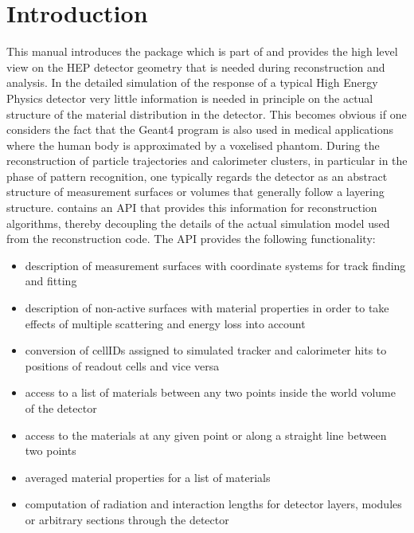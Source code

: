 \documentclass[10pt,a4paper]{article}
\begin{document}
\clearpage
%
%
\tableofcontents
\clearpage
%
%
\setcounter{page}{1}

\section{Introduction}
\label{sec:ddrec-manual-introduction}
\noindent
This manual introduces the \DDR package which is part of \DDH and provides the 
high level view on the HEP detector geometry that is needed during reconstruction and 
analysis. 
In the detailed simulation of the response of a typical High Energy Physics detector
very little information is needed in principle on the actual structure of the material
distribution in the detector. This becomes obvious if one considers the fact that
the Geant4 program is also used in medical applications where the human body 
is approximated by a voxelised phantom.
During the reconstruction of particle trajectories and calorimeter clusters, in particular 
in the phase of pattern recognition, one typically regards the detector as an abstract
structure of measurement surfaces or volumes that generally follow a layering structure.
\DDR contains an API that provides this information for reconstruction algorithms, thereby
decoupling the details of the actual simulation model used from the reconstruction code.
\noindent
The \DDR API provides the following functionality:

\begin{itemize}\itemcompact
\item description of measurement surfaces with coordinate systems for 
  track finding and fitting
\item description of non-active surfaces with material properties in
  order to take effects of multiple scattering and energy loss
  into account
\item conversion of cellIDs assigned to simulated tracker and calorimeter hits
  to positions of readout cells and vice versa
\item access to a list of materials between any two points inside the world
  volume of the detector
\item access to the materials at any given point or along a straight line between two points
\item averaged material properties for a list of materials
\item computation of radiation and interaction lengths for detector layers, modules
  or arbitrary sections through the detector
\end{itemize}
\end{document}
